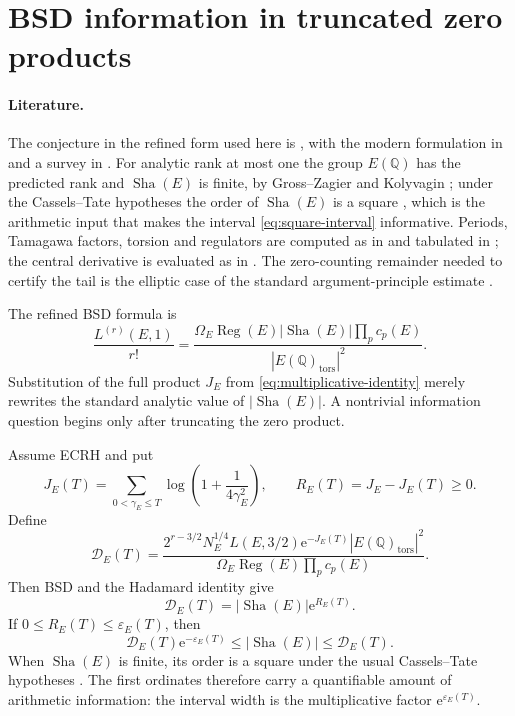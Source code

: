 \documentclass[11pt,reqno]{amsart}
\theoremstyle{remark}
\newcommand{\Q}{\mathbb{Q}}
\newcommand{\ShaE}{\mathop{\mathrm{Sha}}}
\newcommand{\Reg}{\operatorname{Reg}}
\newcommand{\e}{\mathrm{e}}
\begin{document}
\section{BSD information in truncated zero products}
\label{sec:bsd-information}

\paragraph{Literature.}
The conjecture in the refined form used here is \cite{BSD1965}, with the modern formulation in \cite{Tate1966} and a survey in \cite{Wiles2006}.  For analytic rank at most one the group $E(\Q)$ has the predicted rank and $\ShaE(E)$ is finite, by Gross--Zagier \cite{GrossZagier1986} and Kolyvagin \cite{Kolyvagin1988}; under the Cassels--Tate hypotheses the order of $\ShaE(E)$ is a square \cite{Cassels1965,PoonenStoll1999}, which is the arithmetic input that makes the interval \eqref{eq:square-interval} informative.  Periods, Tamagawa factors, torsion and regulators are computed as in \cite{Cremona1997} and tabulated in \cite{LMFDB}; the central derivative is evaluated as in \cite{Dokchitser2004}.  The zero-counting remainder needed to certify the tail is the elliptic case of the standard argument-principle estimate \cite{IwaniecKowalski2004}.

The refined BSD formula is
\begin{equation}
  \frac{L^{(r)}(E,1)}{r!}
  =\frac{\Omega_E\Reg(E)|\ShaE(E)|\prod_p c_p(E)}
  {|E(\Q)_{\mathrm{tors}}|^2}.
  \label{eq:BSD}
\end{equation}
Substitution of the full product $J_E$ from \eqref{eq:multiplicative-identity} merely rewrites the standard analytic value of $|\ShaE(E)|$.  A nontrivial information question begins only after truncating the zero product.

Assume ECRH and put
\begin{equation}
  J_E(T)=\sum_{0<\gamma_E\le T}
  \log\!\left(1+\frac{1}{4\gamma_E^2}\right),
  \qquad
  R_E(T)=J_E-J_E(T)\ge0.
  \label{eq:J-truncation}
\end{equation}
Define
\begin{equation}
  \mathscr D_E(T)
  =\frac{2^{r-3/2}N_E^{1/4}L(E,3/2)\e^{-J_E(T)}
  |E(\Q)_{\mathrm{tors}}|^2}
  {\Omega_E\Reg(E)\prod_p c_p(E)}.
  \label{eq:D-truncated}
\end{equation}
Then BSD and the Hadamard identity give
\begin{equation}
  \mathscr D_E(T)=|\ShaE(E)|\e^{R_E(T)}.
  \label{eq:D-tail}
\end{equation}
If $0\le R_E(T)\le\varepsilon_E(T)$, then
\begin{equation}
  \boxed{
  \mathscr D_E(T)\e^{-\varepsilon_E(T)}
  \le |\ShaE(E)|\le\mathscr D_E(T).
  }
  \label{eq:square-interval}
\end{equation}
When $\ShaE(E)$ is finite, its order is a square under the usual Cassels--Tate hypotheses \cite{Cassels1965,PoonenStoll1999}.  The first ordinates therefore carry a quantifiable amount of arithmetic information: the interval width is the multiplicative factor $\e^{\varepsilon_E(T)}$.
\end{document}
